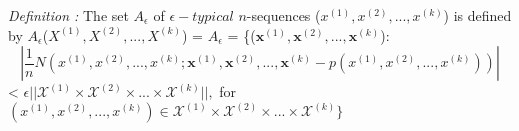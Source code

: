 \documentclass[preview]{standalone}
\begin{document}
\begin{center}
\textit{Definition :} The set $A_{\epsilon}$ of $\epsilon -typical$ $n$-sequences ($x^{(1)},x^{(2)},...,x^{(k)}$) is defined by $A_{\epsilon}$($X^{(1)},X^{(2)},...,X^{(k)}$) = $A_{\epsilon}$ = \{($\textbf{x}^{(1)},\textbf{x}^{(2)},...,\textbf{x}^{(k)}$):$$|\frac{1}{n} N ( x^{(1)},x^{(2)},...,x^{(k)};\textbf{x}^{(1)},\textbf{x}^{(2)},...,\textbf{x}^{(k)} - p(x^{(1)},x^{(2)},...,x^{(k)}) )|$$ < $\epsilon ||\mathscr{X}^{(1)} \times \mathscr{X}^{(2)} \times...\times \mathscr{X}^{(k)}||,$ for $(x^{(1)},x^{(2)},...,x^{(k)}) \in \mathscr{X}^{(1)} \times \mathscr{X}^{(2)} \times...\times \mathscr{X}^{(k)}\}$
\end{center}
\end{document}
